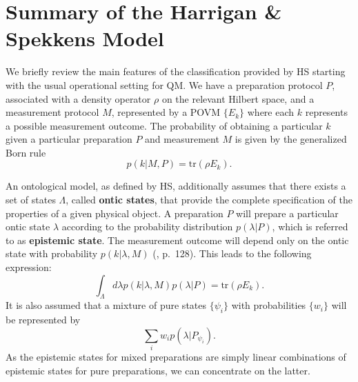 \documentclass[twocolumn,prl,floatfix,superscriptaddress]{revtex4-2}
\begin{document}
\section{Summary of the Harrigan \& Spekkens Model}

We briefly review the main features of the classification provided by HS starting with the usual operational setting for QM. We have a preparation protocol $P$, associated with a density operator $\rho$ on the relevant Hilbert space, and a measurement protocol $M$, represented by a POVM $\{ E_k\}$ where each $k$ represents a possible measurement outcome. The probability of obtaining a particular $k$ given a particular preparation $P$ and measurement $M$ is given by the generalized Born rule
\begin{equation}
	p(k|M, P)=\textrm{tr}(\rho E_k).
\end{equation}

An ontological model, as defined by HS, additionally assumes that there exists a set of states $\Lambda$, called \textbf{ontic states}, that provide the complete specification of the properties of a given physical object. A preparation $P$ will prepare a particular ontic state $\lambda$ according to the probability distribution $p(\lambda | P)$, which is referred to as \textbf{epistemic state}. The measurement outcome will depend only on the ontic state with probability $p(k|\lambda, M)$ (\cite{Harrigan:2010}, p.\ 128). This leads to the following expression:
\begin{equation}
	\int_\Lambda d\lambda p(k|\lambda, M) p(\lambda| P)= \textrm{tr}(\rho E_k).
\end{equation}
It is also assumed that a mixture of pure states $\{ \psi_i \}$ with probabilities $\{ w_i \}$ will be represented by
\begin{equation}\label{epistemic_mixing}
	\sum_i  w_i p(\lambda| P_{\psi_i}).
\end{equation}
As the epistemic states for mixed preparations are simply linear combinations of epistemic states for pure preparations, we can concentrate on the latter.
\end{document}
